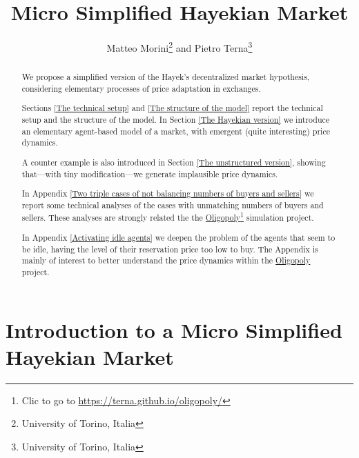 \documentclass[10pt]{report}
\title{Micro Simplified Hayekian Market}
\author{Matteo Morini\footnote{University of Torino, Italia} and Pietro Terna\footnote{University of Torino, Italia}}
\begin{document}
\maketitle
\thispagestyle{fancy}



\begin{abstract}
\thispagestyle{fancy}

We propose a simplified version of the Hayek's decentralized market hypothesis, considering elementary processes of price adaptation in exchanges.

Sections \ref{The technical setup} and \ref{The structure of the model} report the technical setup and the structure of the model. In Section \ref{The Hayekian version} we introduce an elementary agent-based model of a market, with emergent (quite interesting)  price dynamics.

A counter example is also introduced in Section \ref{The unstructured version}, showing that---with tiny modification---we generate implausible price dynamics.

In Appendix \ref{Two triple cases of not balancing numbers of buyers and sellers} we report some technical analyses of the cases with unmatching numbers of buyers and sellers. These analyses are strongly related the the \href{https://terna.github.io/oligopoly/}{Oligopoly}\footnote{Clic to go to \url{https://terna.github.io/oligopoly/}} simulation project.

In Appendix \ref{Activating idle agents} we deepen the problem of the agents that seem to be idle, having the level of their reservation price too low to buy. The Appendix is mainly of interest to  better understand the price dynamics within the \href{https://terna.github.io/oligopoly/}{Oligopoly} project.
\end{abstract}


\setcounter{page}{2}
\tableofcontents
\thispagestyle{fancy}


\listoffigures
\thispagestyle{fancy}
\setcounter{page}{2}




\chapter*{Introduction to a Micro Simplified Hayekian Market}
\label{micro Hayekian Market}
\thispagestyle{fancy}
%
\end{document}
